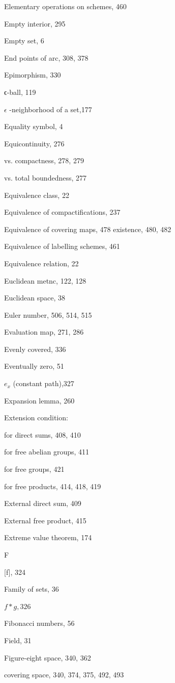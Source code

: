 Elementary operations on schemes, 460

Empty interior, 295

Empty set, 6

End points of arc, 308, 378

Epimorphism, 330

ϵ-ball, 119

\(\epsilon\) -neighborhood of a set,177

Equality symbol, 4

Equicontinuity, 276

vs. compactness, 278, 279

vs. total boundedness, 277

Equivalence class, 22

Equivalence of compactifications, 237

Equivalence of covering maps, 478 existence, 480, 482

Equivalence of labelling schemes, 461

Equivalence relation, 22

Euclidean metnc, 122, 128

Euclidean space, 38

Euler number, 506, 514, 515

Evaluation map, 271, 286

Evenly covered, 336

Eventually zero, 51

\({e}_{x}\) (constant path),327

Expansion lemma, 260

Extension condition:

for direct sums, 408, 410

for free abelian groups, 411

for free groups, 421

for free products, 414, 418, 419

External direct sum, 409

External free product, 415

Extreme value theorem, 174

F

[f], 324

Family of sets, 36

\(f * g,{326}\)

Fibonacci numbers, 56

Field, 31

Figure-eight space, 340, 362

covering space, 340, 374, 375, 492, 493

